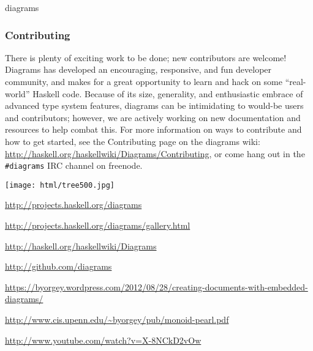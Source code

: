 \documentclass{article}
\begin{document}
\begin{hcarentry}[updated]{diagrams}
\subsubsection*{Contributing}

There is plenty of exciting work to be done; new contributors are
welcome!  Diagrams has developed an encouraging, responsive, and fun
developer community, and makes for a great opportunity to learn and
hack on some ``real-world'' Haskell code.  Because of its size,
generality, and enthusiastic embrace of advanced type system features,
diagrams can be intimidating to would-be users and contributors;
however, we are actively working on new documentation and resources to
help combat this.  For more information on ways to contribute and how
to get started, see the Contributing page on the diagrams wiki:
\url{http://haskell.org/haskellwiki/Diagrams/Contributing}, or come
hang out in the \texttt{\#diagrams} IRC channel on freenode.

\begin{center}
\texttt{[image: html/tree500.jpg]}
\end{center}

\FurtherReading
\begin{compactitem}
\item \url{http://projects.haskell.org/diagrams}
\item \url{http://projects.haskell.org/diagrams/gallery.html}
\item \url{http://haskell.org/haskellwiki/Diagrams}
\item \url{http://github.com/diagrams}
\item
  \url{https://byorgey.wordpress.com/2012/08/28/creating-documents-with-embedded-diagrams/}
\item \url{http://www.cis.upenn.edu/~byorgey/pub/monoid-pearl.pdf}
\item \url{http://www.youtube.com/watch?v=X-8NCkD2vOw}
\end{compactitem}
\end{hcarentry}
\end{document}
